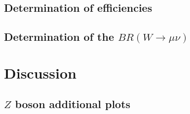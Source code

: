 \documentclass[twoside,        %
               BCOR12mm,       %
               ngerman,english, %
               fleqn,headsepline=false,footsepline=false
              ]{Vorlage/MFPREPORT}
\begin{document}
\subsection{Determination of efficiencies}
\subsection{Determination of the $BR(W\rightarrow\mu\nu)$}
\section{Discussion}
\label{sec:discussion}

\newpage
\begin{appendices}
\section{$Z$ boson additional plots}
\label{app:z}
\begin{figure}
     \begin{center}
        \\ %
\end{center}
\end{figure}
\end{appendices}
\end{document}
